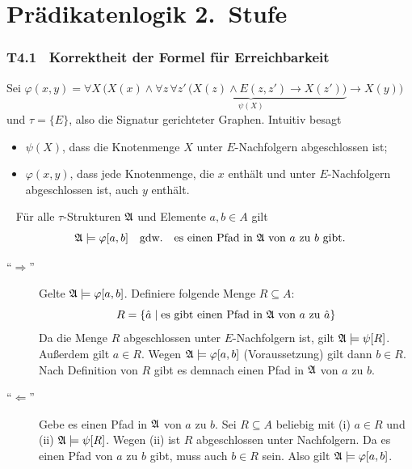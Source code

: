 \documentclass[fontsize=11pt, twoside=false, numbers=autoenddot]{scrbook}
\begin{document}
\part{Prädikatenlogik 2.\ Stufe}

\section*{T4.1~ Korrektheit der Formel für Erreichbarkeit}

Sei
$
  \varphi(x,y) = 
  \forall X\,\Big(
    X(x) \land
    \underbrace{\forall z\,\forall z'\,\big(X(z) \land E(z,z') \to X(z')\big)}_{\psi(X)}
    \to X(y)
  \Big)
$
und $\tau = \{E\}$, also die Signatur gerichteter Graphen.
Intuitiv besagt
\begin{itemize}
  \item
    $\psi(X)$, dass die Knotenmenge $X$ unter $E$-Nachfolgern abgeschlossen ist;
  \item
    $\varphi(x,y)$, dass jede Knotenmenge, die $x$ enthält und unter $E$-Nachfolgern abgeschlossen ist,
    auch $y$ enthält.
\end{itemize}

\par\medskip
{}~
Für alle $\tau$-Strukturen $\mathfrak{A}$ und Elemente $a,b \in A$ gilt
\[
  \mathfrak{A} \models \varphi[a,b]
  \quad\text{gdw.}\quad
  \text{es einen Pfad in $\mathfrak{A}$ von $a$ zu $b$ gibt.}
\]

\begin{beweis}
  \begin{description}
    \item[{\boldmath "`$\Rightarrow$"'}]
      Gelte $\mathfrak{A} \models \varphi[a,b]$.
      Definiere folgende Menge $R \subseteq A$:
      \[
        R = \{\hat a \mid \text{es gibt einen Pfad in $\mathfrak{A}$ von $a$ zu $\hat a$}\}
      \]
      Da die Menge $R$ abgeschlossen unter $E$-Nachfolgern ist,
      gilt $\mathfrak{A} \models \psi[R]$.
      Außerdem gilt $a \in R$.
      Wegen $\mathfrak{A} \models \varphi[a,b]$ (Voraussetzung) gilt dann $b \in R$.
      Nach Definition von $R$ gibt es demnach einen Pfad in $\mathfrak{A}$ von $a$ zu $b$.
    \item[{\boldmath "`$\Leftarrow$"'}]
      Gebe es einen Pfad in $\mathfrak{A}$ von $a$ zu $b$.
      Sei $R \subseteq A$ beliebig mit (i) $a \in R$
      und (ii) $\mathfrak{A} \models \psi[R]$.
      Wegen (ii) ist $R$ abgeschlossen unter Nachfolgern.
      Da es einen Pfad von $a$ zu $b$ gibt, muss auch $b \in R$ sein.
      Also gilt $\mathfrak{A} \models \varphi[a,b]$.
      \qedhere
  \end{description}
\end{beweis}
\end{document}
